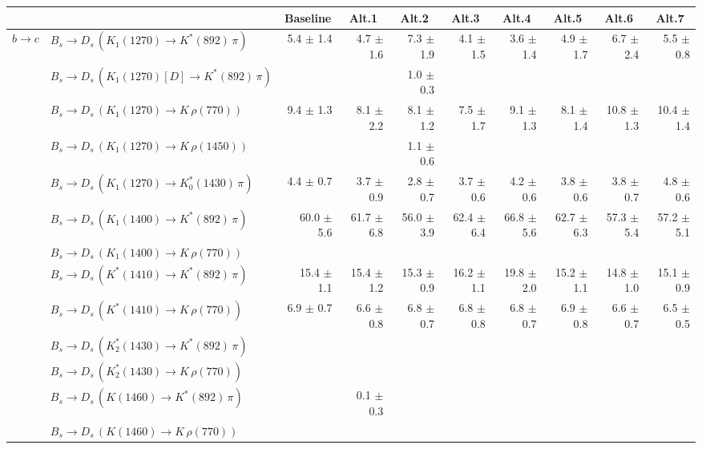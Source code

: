 \begin{tabular}{l l  r  r  r  r  r  r  r  r  } 
\hline
\hline
& & \multicolumn{1}{c}{Baseline}  & \multicolumn{1}{c}{Alt.1}  & \multicolumn{1}{c}{Alt.2}  & \multicolumn{1}{c}{Alt.3}  & \multicolumn{1}{c}{Alt.4}  & \multicolumn{1}{c}{Alt.5}  & \multicolumn{1}{c}{Alt.6}  & \multicolumn{1}{c}{Alt.7}  \\ 
\hline
\multirow{32}{*}{$b \to c$}  & $B_s \to D_s \, ( K_1(1270) \to K^{*}(892) \, \pi )$ & 5.4 $\pm$ 1.4 & 4.7 $\pm$ 1.6 & 7.3 $\pm$ 1.9 & 4.1 $\pm$ 1.5 & 3.6 $\pm$ 1.4 & 4.9 $\pm$ 1.7 & 6.7 $\pm$ 2.4 & 5.5 $\pm$ 0.8 \\ 
 & $B_s \to D_s \, ( K_1(1270)[D] \to K^{*}(892) \, \pi )$ &  &  & 1.0 $\pm$ 0.3 &  &  &  &  &  \\ 
 & $B_s \to D_s \, ( K_1(1270) \to K \, \rho(770) )$ & 9.4 $\pm$ 1.3 & 8.1 $\pm$ 2.2 & 8.1 $\pm$ 1.2 & 7.5 $\pm$ 1.7 & 9.1 $\pm$ 1.3 & 8.1 $\pm$ 1.4 & 10.8 $\pm$ 1.3 & 10.4 $\pm$ 1.4 \\ 
 & $B_s \to D_s \, ( K_1(1270) \to K \, \rho(1450) )$ &  &  & 1.1 $\pm$ 0.6 &  &  &  &  &  \\ 
 & $B_s \to D_s \, ( K_1(1270) \to K^{*}_{0}(1430) \, \pi )$ & 4.4 $\pm$ 0.7 & 3.7 $\pm$ 0.9 & 2.8 $\pm$ 0.7 & 3.7 $\pm$ 0.6 & 4.2 $\pm$ 0.6 & 3.8 $\pm$ 0.6 & 3.8 $\pm$ 0.7 & 4.8 $\pm$ 0.6 \\ 
 & $B_s \to D_s \, ( K_1(1400) \to K^{*}(892) \, \pi )$ & 60.0 $\pm$ 5.6 & 61.7 $\pm$ 6.8 & 56.0 $\pm$ 3.9 & 62.4 $\pm$ 6.4 & 66.8 $\pm$ 5.6 & 62.7 $\pm$ 6.3 & 57.3 $\pm$ 5.4 & 57.2 $\pm$ 5.1 \\ 
 & $B_s \to D_s \, ( K_1(1400) \to K \, \rho(770) )$ &  &  &  &  &  &  &  &  \\ 
 & $B_s \to D_s \, ( K^{*}(1410) \to K^{*}(892) \, \pi )$ & 15.4 $\pm$ 1.1 & 15.4 $\pm$ 1.2 & 15.3 $\pm$ 0.9 & 16.2 $\pm$ 1.1 & 19.8 $\pm$ 2.0 & 15.2 $\pm$ 1.1 & 14.8 $\pm$ 1.0 & 15.1 $\pm$ 0.9 \\ 
 & $B_s \to D_s \, ( K^{*}(1410) \to K \, \rho(770) )$ & 6.9 $\pm$ 0.7 & 6.6 $\pm$ 0.8 & 6.8 $\pm$ 0.7 & 6.8 $\pm$ 0.8 & 6.8 $\pm$ 0.7 & 6.9 $\pm$ 0.8 & 6.6 $\pm$ 0.7 & 6.5 $\pm$ 0.5 \\ 
 & $B_s \to D_s \, ( K_2^{*}(1430) \to K^{*}(892) \, \pi )$ &  &  &  &  &  &  &  &  \\ 
 & $B_s \to D_s \, ( K_2^{*}(1430) \to K \, \rho(770) )$ &  &  &  &  &  &  &  &  \\ 
 & $B_s \to D_s \, ( K(1460) \to K^{*}(892) \, \pi )$ &  & 0.1 $\pm$ 0.3 &  &  &  &  &  &  \\ 
 & $B_s \to D_s \, ( K(1460) \to K \, \rho(770) )$ &  &  &  &  &  &  &  &  \\ 

\end{tabular}
